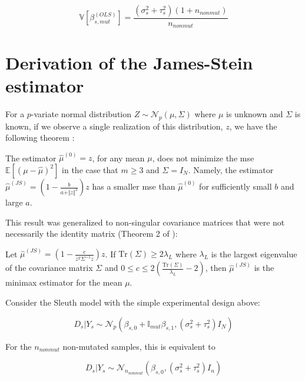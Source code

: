 \begin{equation}
  \mathbb{V} \left[\beta_{s, mut}^{(OLS)} \right] = \frac{(\sigma_s^2 + \tau_s^2)(1 + n_{nonmut})}{n_{nonmut}}
\end{equation}

\section{Derivation of the James-Stein estimator}
\label{sec:JS_derivation}

For a $p$-variate normal distribution $Z \sim \mathcal{N}_p(\mu, \Sigma)$ where $\mu$ is unknown and $\Sigma$ is known, if we observe a single realization of this distribution, $z$, we have the following theorem \cite{steinInadmissibilityUsualEstimator1956}:

\begin{theorem}
  The estimator $\hat{\mu}^{(0)} = z$, for any mean $\mu$, does not minimize the \gls{mse} $\mathbb{E} \left[ (\mu - \hat{\mu})^2 \right]$ in the case that $m \ge 3$ and $\Sigma = I_N$. Namely, the estimator $\hat{\mu}^{(JS)} = \left( 1 - \frac{b}{a + \Vert z \Vert ^2}\right) z$ has a smaller \gls{mse} than $\hat{\mu}^{(0)}$ for sufficiently small $b$ and large $a$.
\end{theorem}

This result was generalized to non-singular covariance matrices that were not necessarily the identity matrix (Theorem 2 of \cite[REF][]{bockMinimaxEstimatorsMean1975}):

\begin{theorem}
  Let $\hat{\mu}^{(JS)} = \left( 1 - \frac{c}{z^T \Sigma^{-1} z}\right) z$. If $\text{Tr}(\Sigma) \ge 2 \lambda_L$ where $\lambda_L$ is the largest eigenvalue of the covariance matrix $\Sigma$ and $0 \le c \le 2 \left( \frac{\text{Tr}(\Sigma)}{\lambda_L} - 2 \right)$, then $\hat{\mu}^{(JS)}$ is the minimax estimator for the mean $\mu$.
\end{theorem}

Consider the Sleuth model with the simple experimental design above:

\begin{equation*}
  D_s | Y_s \sim \mathcal{N}_p \left( \beta_{s,0} + \mathbb{I}_{mut}\beta_{s,1}, (\sigma_s^2 + \tau_s^2)I_N \right)
\end{equation*}

For the $n_{nonmut}$ non-mutated samples, this is equivalent to

\begin{equation*}
  D_s | Y_s \sim \mathcal{N}_{n_{nonmut}} \left( \beta_{s,0}, (\sigma_s^2 + \tau_s^2)I_n \right)
\end{equation*}


